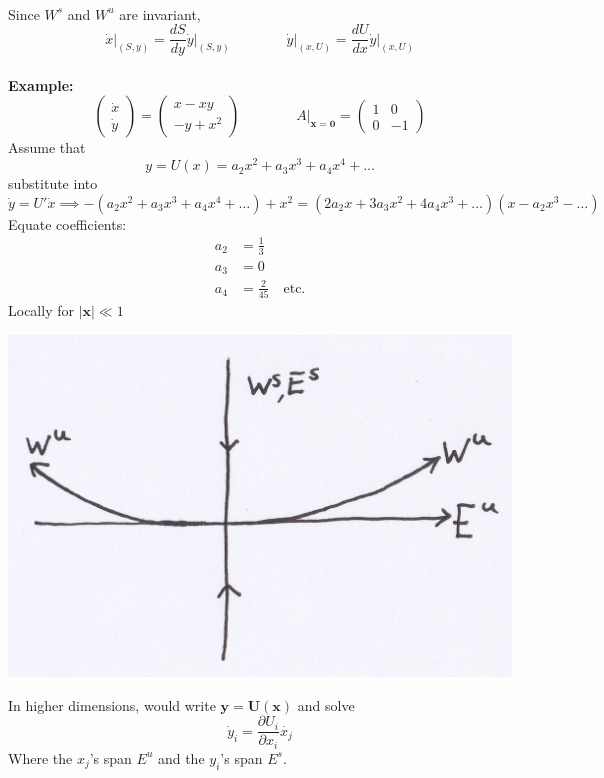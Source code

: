 \documentclass{article}
\newcommand{\example}{\textbf{Example:}}                    %
\begin{document}
\\
Since $W^s$ and $W^u$ are invariant,
\\
\[
 \left. \dot{x}\right|_{(S,y)} = \frac{dS}{dy} \left.\dot{y}\right|_{(S,y)} \qquad \qquad
 \left.\dot{y}\right|_{(x,U)} = \frac{dU}{dx} \left.\dot{y}\right|_{(x,U)}
\]
\\
\example\ 
\[ \left( \begin{array}{c} \dot{x} \\ \dot{y} \end{array} \right) = 
\left( \begin{array}{c} x - xy \\ -y+x^2 \end{array} \right) \qquad \qquad
A|_{\bm{x} = \bm{0}} = \left( \begin{array}{cr} 1 & 0 \\ 0 & -1 \end{array} \right) \]
Assume that
\[ y = U(x) = a_2 x^2 + a_3 x^3 + a_4 x^4 + \dots \]
substitute into 
\[ \dot{y} = U'\dot{x}  \implies -(a_2x^2+a_3x^3 + a_4x^4 + \dots) + x^2 
= (2a_2x + 3a_3x^2 + 4a_4x^3 + \dots)(x - a_2x^3 - \dots ) \]
Equate coefficients:
\begin{align*}
a_2 &= \frac{1}{3} \\
a_3 &= 0 \\
a_4 &= \frac{2}{45} \quad \mbox{etc.}
\end{align*}
Locally for $|\bm{x}| \ll 1$ \\
\begin{center}
\includegraphics[scale = 0.15]{Diagram3.png}
\end{center}
In higher dimensions, would write $\bm{y} = \bm{U}(\bm{x})$ and solve
\[ \dot{y}_i = \frac{\partial U_i}{\partial x_i} \dot{x_j} \]
Where the $x_j$'s span $E^u$ and the $y_i$'s span $E^s$.
\end{document}
